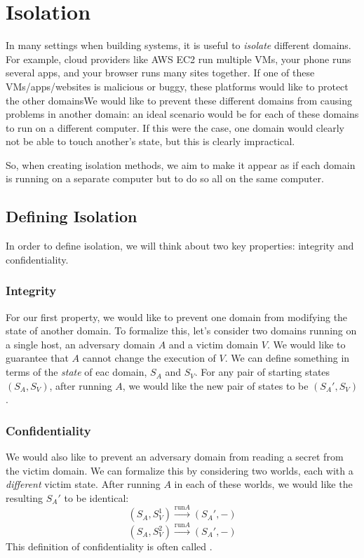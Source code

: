 \chapter{Isolation}

In many settings when building systems, it is useful to \emph{isolate} different domains. For example, cloud providers like AWS EC2 run multiple VMs, your phone runs several apps, and your browser runs many sites together. If one of these VMs/apps/websites is malicious or buggy, these platforms would like to protect the other domainsWe would like to prevent these different domains from causing problems in another domain: an ideal scenario would be for each of these domains to run on a different computer. If this were the case, one domain would clearly not be able to touch another's state, but this is clearly impractical.

So, when creating isolation methods, we aim to make it appear as if each domain is running on a separate computer but to do so all on the same computer.

\section{Defining Isolation}
In order to define isolation, we will think about two key properties: integrity and confidentiality.

\subsection{Integrity}
For our first property, we would like to prevent one domain from modifying the state of another domain. To formalize this, let's consider two domains running on a single host, an adversary domain $A$ and a victim domain $V$. We would like to guarantee that $A$ cannot change the execution of $V$. We can define something in terms of the \emph{state} of eac domain, $S_A$ and $S_V$. For any pair of starting states $(S_A, S_V)$, after running $A$, we would like the new pair of states to be $(S_A', S_V)$.

\subsection{Confidentiality}
We would also like to prevent an adversary domain from reading a secret from the victim domain. We can formalize this by considering two worlds, each with a \emph{different} victim state. After running $A$ in each of these worlds, we would like the resulting $S_A'$ to be identical:
\[ (S_A, S_V^1) \xrightarrow{\text{run} A} (S_A', -) \]
\[ (S_A, S_V^2) \xrightarrow{\text{run} A} (S_A', -) \]
This definition of confidentiality is often called .


